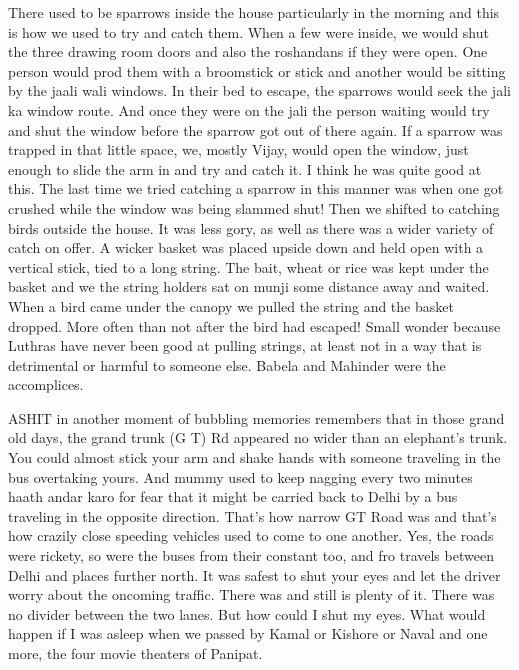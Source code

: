 There used to be sparrows inside the house particularly in the morning and this is how we used to try and catch them. When a few were inside, we would shut the three drawing room doors and also the roshandans if they were open. One person would prod them with a broomstick or stick and another would be sitting by the jaali wali windows. In their bed to escape, the sparrows would seek the jali ka window route. And once they were on the jali the person waiting would try and shut the window before the sparrow got out of there again. If a sparrow was trapped in that little space, we, mostly Vijay, would open the window, just enough to slide the arm in and try and catch it. I think he was quite good at this. The last time we tried catching a sparrow in this manner was when one got crushed while the window was being slammed shut! Then we shifted to catching birds outside the house. It was less gory, as well as there was a wider variety of catch on offer. A wicker basket was placed upside down and held open with a vertical stick, tied to a long string. The bait, wheat or rice was kept under the basket and we the string holders sat on munji some distance away and waited. When a bird came under the canopy we pulled the string and the basket dropped. More often than not after the bird had escaped! Small wonder because Luthras have never been good at pulling strings, at least not in a way that is detrimental or harmful to someone else. Babela and Mahinder were the accomplices. 

ASHIT in another moment of bubbling memories remembers that in those grand old days, the grand trunk (G T) Rd appeared no wider than an elephant’s trunk. You could almost stick your arm and shake hands with someone traveling in the bus overtaking yours. And mummy used to keep nagging every two minutes haath andar karo for fear that it might be carried back to Delhi by a bus traveling in the opposite direction. That’s how narrow GT Road was and that’s how crazily close speeding vehicles used to come to one another. Yes, the roads were rickety, so were the buses from their constant too, and fro travels between Delhi and places further north. It was safest to shut your eyes and let the driver worry about the oncoming traffic. There was and still is plenty of it. There was no divider between the two lanes. But how could I shut my eyes. What would happen if I was asleep when we passed by Kamal or Kishore or Naval and one more, the four movie theaters of Panipat.

